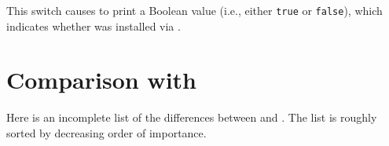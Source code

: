 \documentclass[onecolumn,11pt,nocopyrightspace,preprint]{sigplanconf}
\begin{document}
\docswitch{\osuggestocamlfind} This switch causes \menhir to print a Boolean
value (i.e., either \texttt{true} or \texttt{false}), which indicates whether
\menhirlib was installed via \ocamlfind.


\section{Comparison with \ocamlyacc}


Here is an incomplete list of the differences between \ocamlyacc and \menhir.
The list is roughly sorted by decreasing order of importance.
\end{document}
